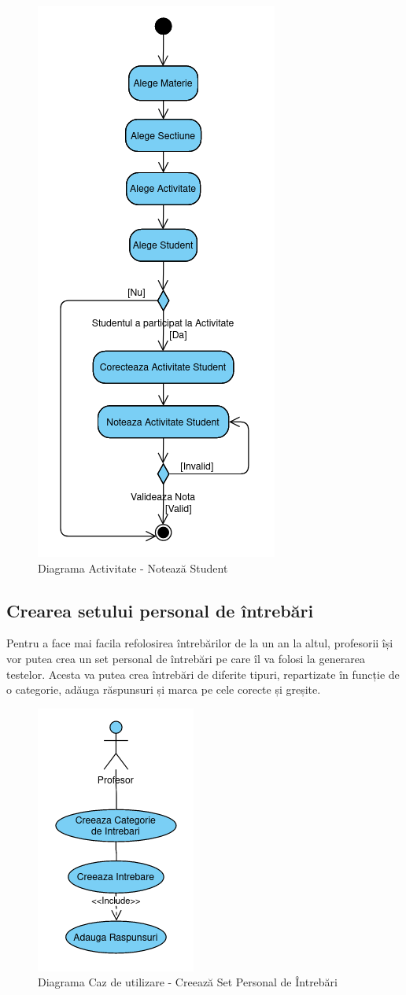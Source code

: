 \documentclass[12pt, a4paper, oneside, romanian]{teza-upb}
\begin{document}
\begin{figure}[H]
\centering
\includegraphics*[width=0.45\columnwidth]{diagrama-activitate-noteaza-student}
\caption{Diagrama Activitate - Notează Student}
\label{diagrama-activitate-noteaza-student}
\end{figure}

\subsection{Crearea setului personal de întrebări}

Pentru a face mai facila refolosirea întrebărilor de la un an la altul, profesorii își vor putea crea un set personal de întrebări pe care îl va folosi la generarea testelor. Acesta va putea crea întrebări de diferite tipuri, repartizate în funcție de o categorie, adăuga răspunsuri și marca pe cele corecte și greșite.

\begin{figure}[H]
\centering
\includegraphics*[width=0.3\columnwidth]{diagrama-use-case-creeaza-set-personal-de-intrebari}
\caption{Diagrama Caz de utilizare - Creează Set Personal de Întrebări}
\label{diagrama-use-case-creeaza-set-personal-de-intrebari}
\end{figure}
\end{document}
